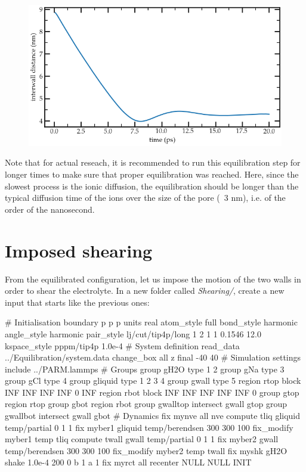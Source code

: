 \begin{figure}
\includegraphics[width=\linewidth]{tutorials/level2/nanosheared-electrolyte/equilibration-light.png}
\end{figure}

Note that for actual reseach, it is recommended to run this equilibration step for longer times
to make sure that proper equilibration was reached. Here, since the slowest
process is the ionic diffusion, the equilibration 
should be longer than the typical diffusion time of the ions over the 
size of the pore (~3 nm), i.e. of the order of the nanosecond.

\section{Imposed shearing}

\noindent From the equilibrated configuration, let us impose the
motion of the two walls in order to shear the electrolyte.
In a new folder called \textit{Shearing/},
create a new input that starts like the previous ones:

\begin{lcverbatim}
# Initialisation
boundary p p p
units real
atom_style full
bond_style harmonic
angle_style harmonic
pair_style lj/cut/tip4p/long 1 2 1 1 0.1546 12.0
kspace_style pppm/tip4p 1.0e-4
# System definition
read_data ../Equilibration/system.data
change_box all z final -40 40
# Simulation settings
include ../PARM.lammps
# Groups
group gH2O type 1 2
group gNa type 3
group gCl type 4
group gliquid type 1 2 3 4
group gwall type 5
region rtop block INF INF INF INF 0 INF
region rbot block INF INF INF INF INF 0
group gtop region rtop
group gbot region rbot
group gwalltop intersect gwall gtop
group gwallbot intersect gwall gbot
# Dynamics
fix mynve all nve
compute tliq gliquid temp/partial 0 1 1
fix myber1 gliquid temp/berendsen 300 300 100
fix_modify myber1 temp tliq
compute twall gwall temp/partial 0 1 1
fix myber2 gwall temp/berendsen 300 300 100
fix_modify myber2 temp twall
fix myshk gH2O shake 1.0e-4 200 0 b 1 a 1
fix myrct all recenter NULL NULL INIT
\end{lcverbatim}

